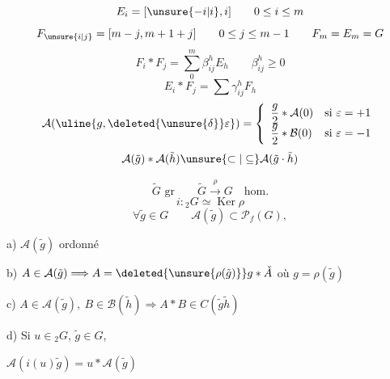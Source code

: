\[
E_i=[\unsure{-i|i},i]\qquad0\leq i\leq m
\]
\[
F_{\unsure{i|j}}=[m-j,m+1+j]\qquad0\leq j\leq m-1\qquad F_m=E_m=G
\]
\inserted{\[
E_i\ast E_j=\sum\alpha_{ij}^h E_h\qquad\alpha_{ij}^h\geq0
\]}
\[
F_i\ast F_j=\sum_0^m\beta_{ij}^h E_h\qquad\beta_{ij}^h\geq0
\]
\[
E_i\ast F_j=\sum\gamma_{ij}^h F_h
\]
\[
\mathcal A(\uline{g,\deleted{\unsure{\delta}}\varepsilon})=
\left\{\begin{array}{ll}
\dfrac g2\ast\mathcal A(0)&\text{si }\varepsilon=+1\\
\dfrac g2\ast\mathcal B(0)&\text{si }\varepsilon=-1
\end{array}\right.
\]
\[
\mathcal A(\tilde g)\ast\mathcal A(\tilde h)\unsure{\subset|\subseteq}\mathcal A(\tilde g\cdot\tilde h)
\]

\[
\tilde G\text{ gr}\qquad\tilde G\xrightarrow{\rho}G\quad\text{hom.}
\]
\[
i:{}_2G\simeq\operatorname{Ker}\rho
\]
\[
\forall\tilde g\in G\qquad\mathcal A(\tilde g)\subset\mathcal P_f(G),
\]

a) $\mathcal A(\tilde g)$  ordonné

b) $A\in\mathcal A(\tilde g)\Longrightarrow A=\deleted{\unsure{\rho(\tilde g)}}g\ast\check A$ où $g=\rho(\tilde g)$

c) $A\in\mathcal A(\tilde g),\ B\in\mathcal B(\tilde h)\Longrightarrow A\ast B\in C(\tilde g\tilde h)$

d) Si $u\in{}_2G$, $\tilde g\in G$, \unsure{$\ldots$}

$\mathcal A(i(u)\tilde g)=u\ast\mathcal A(\tilde g)$

